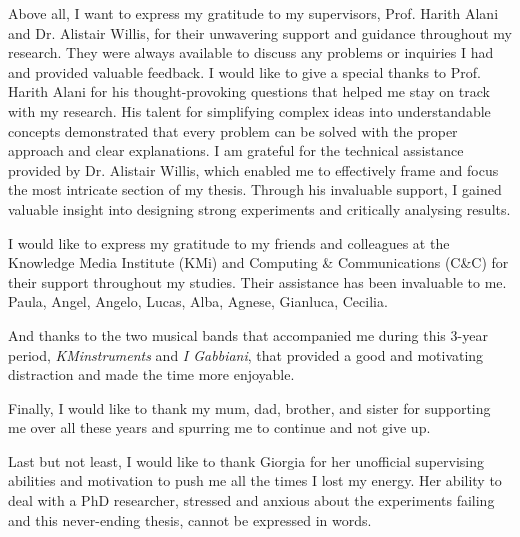Above all, I want to express my gratitude to my supervisors, Prof. Harith Alani and Dr. Alistair Willis, for their unwavering support and guidance throughout my research. They were always available to discuss any problems or inquiries I had and provided valuable feedback.
I would like to give a special thanks to Prof. Harith Alani for his thought-provoking questions that helped me stay on track with my research. His talent for simplifying complex ideas into understandable concepts demonstrated that every problem can be solved with the proper approach and clear explanations.
I am grateful for the technical assistance provided by Dr. Alistair Willis, which enabled me to effectively frame and focus the most intricate section of my thesis. Through his invaluable support, I gained valuable insight into designing strong experiments and critically analysing results.


I would like to express my gratitude to my friends and colleagues at the Knowledge Media Institute (KMi) and Computing \& Communications (C\&C) for their support throughout my studies. Their assistance has been invaluable to me. Paula, Angel, Angelo, Lucas, Alba, Agnese, Gianluca, Cecilia.

And thanks to the two musical bands that accompanied me during this 3-year period, \emph{KMinstruments} and \emph{I Gabbiani}, that provided a good and motivating distraction and made the time more enjoyable. 

Finally, I would like to thank my mum, dad, brother, and sister for supporting me over all these years and spurring me to continue and not give up.

Last but not least, I would like to thank Giorgia for her unofficial supervising abilities and motivation to push me all the times I lost my energy. Her ability to deal with a PhD researcher, stressed and anxious about the experiments failing and this never-ending thesis, cannot be expressed in words.
